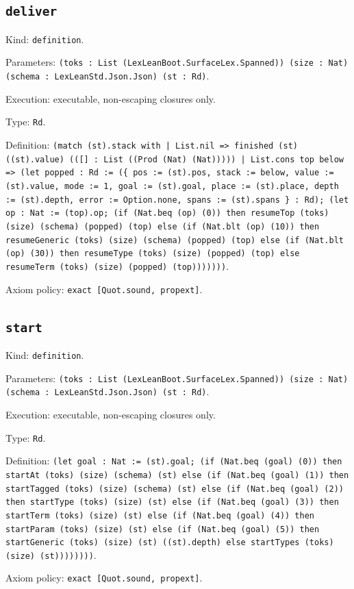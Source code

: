 \documentclass[11pt]{article}
\begin{document}
\subsection*{\texttt{deliver}}
\noindent Kind: \texttt{definition}.\par
\noindent Parameters: \texttt{(toks : List (LexLeanBoot.SurfaceLex.Spanned)) (size : Nat) (schema : LexLeanStd.Json.Json) (st : Rd)}.\par
\noindent Execution: executable, non-escaping closures only.\par
\noindent Type: \texttt{Rd}.\par
\noindent Definition: \texttt{(match (st).stack with | List.nil => finished (st) ((st).value) (([] : List ((Prod (Nat) (Nat))))) | List.cons top below => (let popped : Rd := (\{ pos := (st).pos, stack := below, value := (st).value, mode := 1, goal := (st).goal, place := (st).place, depth := (st).depth, error := Option.none, spans := (st).spans \} : Rd); (let op : Nat := (top).op; (if (Nat.beq (op) (0)) then resumeTop (toks) (size) (schema) (popped) (top) else (if (Nat.blt (op) (10)) then resumeGeneric (toks) (size) (schema) (popped) (top) else (if (Nat.blt (op) (30)) then resumeType (toks) (size) (popped) (top) else resumeTerm (toks) (size) (popped) (top)))))))}.\par
\noindent Axiom policy: \texttt{exact [Quot.sound, propext]}.\par
\subsection*{\texttt{start}}
\noindent Kind: \texttt{definition}.\par
\noindent Parameters: \texttt{(toks : List (LexLeanBoot.SurfaceLex.Spanned)) (size : Nat) (schema : LexLeanStd.Json.Json) (st : Rd)}.\par
\noindent Execution: executable, non-escaping closures only.\par
\noindent Type: \texttt{Rd}.\par
\noindent Definition: \texttt{(let goal : Nat := (st).goal; (if (Nat.beq (goal) (0)) then startAt (toks) (size) (schema) (st) else (if (Nat.beq (goal) (1)) then startTagged (toks) (size) (schema) (st) else (if (Nat.beq (goal) (2)) then startType (toks) (size) (st) else (if (Nat.beq (goal) (3)) then startTerm (toks) (size) (st) else (if (Nat.beq (goal) (4)) then startParam (toks) (size) (st) else (if (Nat.beq (goal) (5)) then startGeneric (toks) (size) (st) ((st).depth) else startTypes (toks) (size) (st))))))))}.\par
\noindent Axiom policy: \texttt{exact [Quot.sound, propext]}.\par
\end{document}
